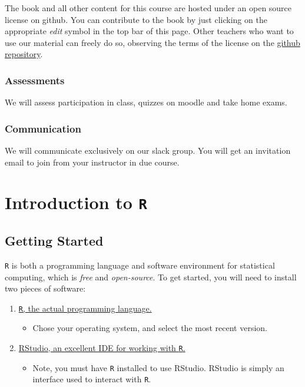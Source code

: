 \documentclass[]{book}
\providecommand{\tightlist}{%
  \setlength{\itemsep}{0pt}\setlength{\parskip}{0pt}}
\begin{document}
The book and all other content for this course are hosted under an open
source license on github. You can contribute to the book by just
clicking on the appropriate \emph{edit} symbol in the top bar of this
page. Other teachers who want to use our material can freely do so,
observing the terms of the license on the
\href{https://github.com/ScPoEcon/ScPoEconometrics}{github repository}.

\subsection*{Assessments}\label{assessments}

We will assess participation in class, quizzes on moodle and take home
exams.

\subsection*{Communication}\label{communication}

We will communicate exclusively on our slack group. You will get an
invitation email to join from your instructor in due course.

\chapter{\texorpdfstring{Introduction to
\texttt{R}}{Introduction to R}}\label{R-intro}

\section{Getting Started}\label{getting-started}

\texttt{R} is both a programming language and software environment for
statistical computing, which is \emph{free} and \emph{open-source}. To
get started, you will need to install two pieces of software:

\begin{enumerate}
\def\labelenumi{\arabic{enumi}.}
\tightlist
\item
  \href{https://www.r-project.org}{\texttt{R}, the actual programming
  language.}

  \begin{itemize}
  \tightlist
  \item
    Chose your operating system, and select the most recent version.
  \end{itemize}
\item
  \href{http://www.rstudio.com/}{RStudio, an excellent IDE for working
  with \texttt{R}.}

  \begin{itemize}
  \tightlist
  \item
    Note, you must have \texttt{R} installed to use RStudio. RStudio is
    simply an interface used to interact with \texttt{R}.
  \end{itemize}
\end{enumerate}
\end{document}

